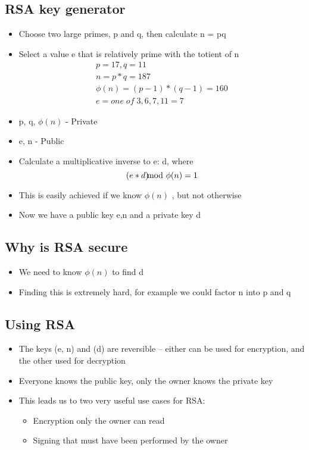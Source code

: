 \documentclass{article}
\begin{document}
\subsection{RSA key generator}
\begin{itemize}
  \item Choose two large primes, p and q, then calculate n = pq
  \item Select a value e that is relatively prime with the totient of n
  \begin{gather}
    p = 17, q = 11 \\
    n = p * q = 187 \\
    \phi(n) = (p - 1)*(q - 1) = 160 \\
    e =  one \; of \; 3, 6, 7, 11 = 7
  \end{gather}
  \item p, q, $\phi(n)$ - Private
  \item e, n - Public
  \item Calculate a multiplicative inverse to e: d, where
    \[ (e * d) \kern-0.3cm \mod{\phi(n)} = 1 \]
  \item This is easily achieved if we know $\phi(n)$ , but not otherwise
  \item Now we have a public key e,n and a private key d
\end{itemize}

\subsection{Why is RSA secure}
\begin{itemize}
  \item We need to know $\phi(n)$ to find d
  \item Finding this is extremely hard, for example we could factor n into p and q
\end{itemize}

\subsection{Using RSA}
\begin{itemize}
  \item The keys (e, n) and (d) are reversible – either can be used for encryption, and the other used for decryption
  \item Everyone knows the public key, only the owner knows the private key 
  \item This leads us to two very useful use cases for RSA:
  \begin{itemize}
    \item Encryption only the owner can read  
    \item Signing that must have been performed by the owner
  \end{itemize}
\end{itemize}
\end{document}
